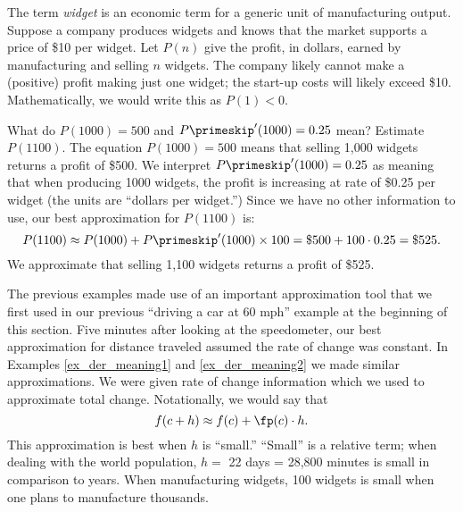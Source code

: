 \begin{example}\label{ex_der_meaning2}
The term \emph{widget} is an economic term for a generic unit of manufacturing output. Suppose a company produces widgets and knows that the market supports a price of \$10 per widget. Let $P(n)$ give the profit, in dollars, earned by manufacturing and selling $n$ widgets. The company likely cannot make a (positive) profit making just one widget; the start-up costs will likely exceed \$10. Mathematically, we would write this as $P(1) < 0$.

What do $P(1000) = 500$ and $P\primeskip'(1000)=0.25$ mean? Estimate $P(1100)$.
\solution
The equation $P(1000)=500$ means that selling 1,000 widgets returns a profit of \$500. We interpret $P\primeskip'(1000) = 0.25$ as meaning that when producing 1000 widgets, the profit is increasing at rate of \$0.25 per widget (the units are ``dollars per widget.'') Since we have no other information to use, our best approximation for $P(1100)$ is:
\[P(1100)\approx P(1000)+P\primeskip'(1000)\times100=\$500+100\cdot0.25=\$525.\]
We approximate that selling 1,100 widgets returns a profit of \$525.
\end{example}

The previous examples made use of an important approximation tool that we first used in our previous ``driving a car at 60 mph'' example at the beginning of this section. Five minutes after looking at the speedometer, our best approximation for distance traveled assumed the rate of change was constant. In Examples \ref{ex_der_meaning1} and \ref{ex_der_meaning2} we made similar approximations. We were given rate of change information which we used to approximate total change. Notationally, we would say that 
\[f(c+h) \approx f(c) + \fp(c)\cdot h.\]
This approximation is best when $h$ is ``small.'' ``Small'' is a relative term; when dealing with the world population, $h=$ 22 days = 28,800 minutes is small in comparison to years. When manufacturing widgets, 100 widgets is small when one plans to manufacture thousands.


